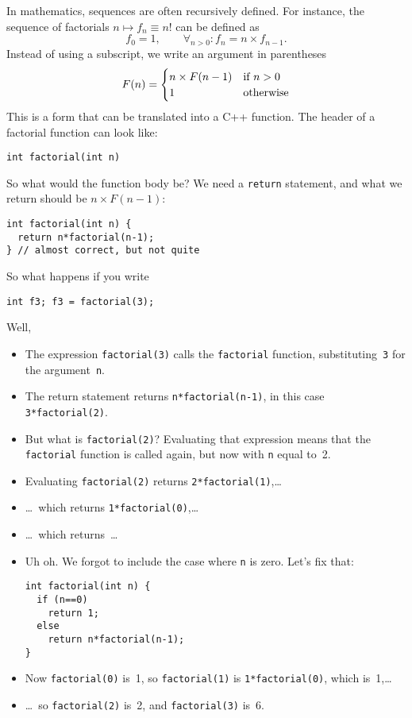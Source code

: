 In mathematics, sequences are often recursively defined. For instance,
the sequence of factorials $n\mapsto f_n\equiv n!$ can be defined as
\[ f_0=1,\qquad \forall_{n>0}\colon f_n=n\times f_{n-1}. \]
Instead of using a subscript, we write an argument in parentheses
%
\[ F(n) = 
\begin{cases}
  n \times F(n-1) & \hbox{if $n>0$} \\
  1 &\hbox{otherwise} 
\end{cases}
\]
%
This is a form that can be translated into a C++ function.
The header of a factorial function can look like:
\begin{lstlisting}
int factorial(int n)
\end{lstlisting}
So what would the
function body be? We need a \lstinline{return} statement, and what we return
should be $n \times F(n-1)$:
\begin{lstlisting}
int factorial(int n) {
  return n*factorial(n-1);
} // almost correct, but not quite
\end{lstlisting}
So what happens if you write
\begin{lstlisting}
int f3; f3 = factorial(3);
\end{lstlisting}
Well,
\begin{itemize}
\item The expression \lstinline{factorial(3)} calls the \lstinline{factorial}
  function, substituting~\lstinline{3} for the argument~\lstinline{n}.
\item The return statement returns \lstinline{n*factorial(n-1)}, in this case
  \lstinline{3*factorial(2)}.
\item But what is \lstinline{factorial(2)}? Evaluating that expression means
  that the \lstinline{factorial} function is called again, but now with \lstinline{n}
  equal to~2.
\item Evaluating \lstinline{factorial(2)} returns \lstinline{2*factorial(1)},\ldots
\item \ldots~which returns \lstinline{1*factorial(0)},\ldots
\item \ldots~which returns~\ldots
\item Uh oh. We forgot to include the case where \lstinline{n} is zero. Let's
  fix that:
\begin{lstlisting}
int factorial(int n) {
  if (n==0)
    return 1;
  else
    return n*factorial(n-1);
}
\end{lstlisting}
\item Now \lstinline{factorial(0)} is~1, so \lstinline{factorial(1)} is
  \lstinline{1*factorial(0)}, which is~1,\ldots
\item \ldots~so \lstinline{factorial(2)} is~2, and \lstinline{factorial(3)} is~6.
\end{itemize}

